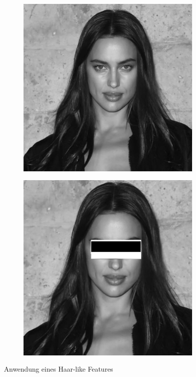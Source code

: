 \documentclass{article}
\begin{document}
\begin{figure}[h!]
	\centering
	\begin{subfigure}{.5\textwidth}
		\centering
		\includegraphics[width=0.9\linewidth]{irina_sheyk}
		\label{fig:sub1}
	\end{subfigure}%
	\begin{subfigure}{.5\textwidth}
		\centering
		\includegraphics[width=0.9\linewidth]{irina_haar_cascade}
		\label{fig:sub2}
	\end{subfigure}
	\caption{Anwendung eines Haar-like Features}
	\label{fig:test}
\end{figure}
\end{document}

